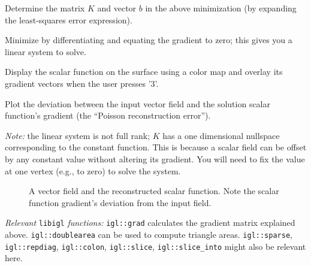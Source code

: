 \documentclass[11pt]{amsart}
\newcommand{\itemz}[1]{{\begin{itemize}{#1}\end{itemize}}}
\begin{document}
\itemz{
    \item Determine the matrix $K$ and vector $b$ in the above minimization (by
        expanding the least-squares error expression).
\item Minimize by differentiating and equating the gradient to zero; this gives
    you a linear system to solve.
\item Display the scalar function on the surface using a color map and overlay
    its gradient vectors when the user presses '3'.
\item Plot the deviation between the input vector field and the solution scalar
    function's gradient (the ``Poisson reconstruction error'').
}

\emph{Note:}
the linear system is not full rank; $K$ has a one dimensional nullspace
corresponding to the constant function. This is because a scalar field can be
offset by any constant value without altering its gradient. You will need to
fix the value at one vertex (e.g., to zero) to solve the system.

\begin{figure}[h!]
   \centering
\hspace{2cm}
   \caption{A vector field and the reconstructed scalar function. Note the
    scalar function gradient's deviation from the input field.}
   \label{fig:vf}
\end{figure}

\emph{Relevant} \texttt{libigl} \emph{functions: } \texttt{igl::grad}
calculates the gradient matrix explained above. \texttt{igl::doublearea} can be
used to compute triangle areas. \texttt{igl::sparse},
\texttt{igl::repdiag}, \texttt{igl::colon}, \texttt{igl::slice},
\texttt{igl::slice\_into} might also be relevant here.
\end{document}
